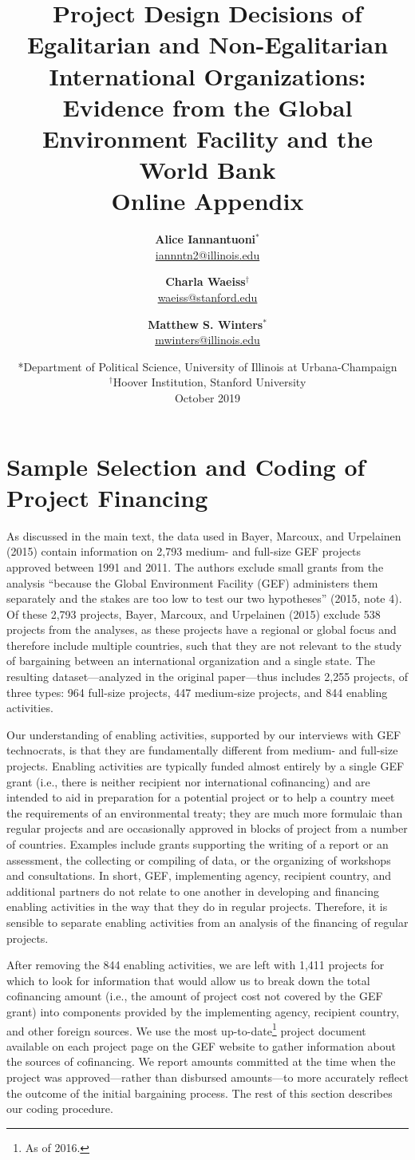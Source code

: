 \documentclass{article}
\title{Project Design Decisions of Egalitarian and Non-Egalitarian International Organizations: Evidence from the Global Environment Facility and the World Bank \\ \textbf{Online Appendix} \\[2ex]}
\author{\textbf{Alice Iannantuoni}$^*$ \\ \href{mailto:iannntn2@illinois.edu}{iannntn2@illinois.edu} \and \textbf{Charla Waeiss}$^\dagger$ \\ \href{mailto:waeiss@stanford.edu}{waeiss@stanford.edu} \and \textbf{Matthew S. Winters}$^*$ \\ \href{mailto:mwinters@illinois.edu}{mwinters@illinois.edu}}
\date{%
	*Department of Political Science, University of Illinois at Urbana-Champaign\\
	$^\dagger$Hoover Institution, Stanford University\\[4ex]%
	October 2019
}
\begin{document}
	
\maketitle

\doublespacing 

\section{Sample Selection and Coding of Project Financing}
As discussed in the main text, the data used in Bayer, Marcoux, and Urpelainen (2015) contain information on 2,793 medium- and full-size GEF projects approved between 1991 and 2011. The authors exclude small grants from the analysis “because the Global Environment Facility (GEF) administers them separately and the stakes are too low to test our two hypotheses” (2015, note 4). Of these 2,793 projects, Bayer, Marcoux, and Urpelainen (2015) exclude 538 projects from the analyses, as these projects have a regional or global focus and therefore include multiple countries, such that they are not relevant to the study of bargaining between an international organization and a single state. The resulting dataset---analyzed in the original paper---thus includes 2,255 projects, of three types: 964 full-size projects, 447 medium-size projects, and 844 enabling activities. 

Our understanding of enabling activities, supported by our interviews with GEF technocrats, is that they are fundamentally different from medium- and full-size projects. Enabling activities are typically funded almost entirely by a single GEF grant (i.e., there is neither recipient nor international cofinancing) and are intended to aid in preparation for a potential project or to help a country meet the requirements of an environmental treaty; they are much more formulaic than regular projects and are occasionally approved in blocks of project from a number of countries. Examples include grants supporting the writing of a report or an assessment, the collecting or compiling of data, or the organizing of workshops and consultations. In short, GEF, implementing agency, recipient country, and additional partners do not relate to one another in developing and financing enabling activities in the way that they do in regular projects. Therefore, it is sensible to separate enabling activities from an analysis of the financing of regular projects. 

After removing the 844 enabling activities, we are left with 1,411 projects for which to look for information that would allow us to break down the total cofinancing amount (i.e., the amount of project cost not covered by the GEF grant) into components provided by the implementing agency, recipient country, and other foreign sources. We use the most up-to-date\footnote{As of 2016.}  project document available on each project page on the GEF website to gather information about the sources of cofinancing.  We report amounts committed at the time when the project was approved---rather than disbursed amounts---to more accurately reflect the outcome of the initial bargaining process. The rest of this section describes our coding procedure. 
\end{document}
